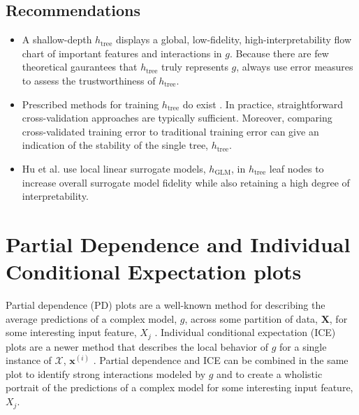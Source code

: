 \documentclass[11pt]{asaproc}
\begin{document}
\subsection{Recommendations}

\begin{itemize}
	
	\item A shallow-depth $h_{\text{tree}}$ displays a global, low-fidelity, high-interpretability flow chart of important features and interactions in $g$. Because there are few theoretical gaurantees that $h_{\text{tree}}$ truly represents $g$, always use error measures to assess the trustworthiness of $h_{\text{tree}}$.
	
	\item Prescribed methods for training $h_{\text{tree}}$ do exist \cite{dt_surrogate1} \cite{dt_surrogate2}. In practice, straightforward cross-validation approaches are typically sufficient. Moreover, comparing cross-validated training error to traditional training error can give an indication of the stability of the single tree, $h_{\text{tree}}$.
	
	\item Hu et al. use local linear surrogate models, $h_{\text{GLM}}$, in $h_{\text{tree}}$ leaf nodes to increase overall surrogate model fidelity while also retaining a high degree of interpretability.
	
\end{itemize}

\section{Partial Dependence and Individual Conditional Expectation plots}
\label{sec:pd_ice}

Partial dependence (PD) plots are a well-known method for describing the average predictions of a complex model, $g$, across some partition of data, $\mathbf{X}$, for some interesting input feature, $X_j$ \cite{esl}. Individual conditional expectation (ICE) plots are a newer method that describes the local behavior of $g$ for a single instance of $\mathcal{X}$, $\mathbf{x}^{(i)}$ \cite{ice_plots}. Partial dependence and ICE can be combined in the same plot to identify strong interactions modeled by $g$ and to create a wholistic portrait of the predictions of a complex model for some interesting input feature, $X_j$.
\end{document}
